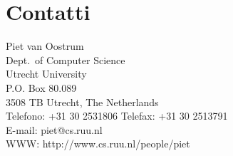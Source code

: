 \documentclass[a4paper,italian]{article}
\begin{document}
\clearpage
\section{Contatti}

Piet van Oostrum\\
Dept.\ of Computer Science\\
Utrecht University\\
P.O. Box 80.089\\
3508 TB Utrecht, The Netherlands\\
Telefono: +31 30 2531806 Telefax: +31 30 2513791\\
E-mail: piet@cs.ruu.nl \\
WWW: http://www.cs.ruu.nl/people/piet

\printindex
\end{document}

